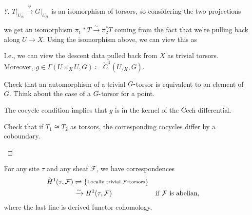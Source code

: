 \begin{proof}[?]

\({ \left.{{T}} \right|_{{U_\text{ét}}} } \xrightarrow{\phi} { \left.{{G}} \right|_{{U_\text{ét}}} }\)
is an isomorphism of torsors, so considering the two projections

we get an isomorphism \(\pi_1*T \xrightarrow{\sim}\pi_2^* T\) coming
from the fact that we're pulling back along \(U\to X\). Using the
isomorphism above, we can view this as

I.e., we can view the descent data pulled back from \(X\) as trivial
torsors. Moreover,
\(g\in \Gamma(U\times_X U, G) \coloneqq{\check{C}}^1(U_{/X}, G)\).

\begin{exercise}[?]

Check that an automorphism of a trivial \(G{\hbox{-}}\)torsor is
equivalent to an element of \(G\). Think about the case of a
\(G{\hbox{-}}\)torsor for a point.

\end{exercise}

\begin{claim}

The cocycle condition implies that \(g\) is in the kernel of the Čech
differential.

\end{claim}

\begin{exercise}[?]

Check that if \(T_1 \cong T_2\) as torsors, the corresponding cocycles
differ by a coboundary.

\end{exercise}

\end{proof}

\begin{proposition}[Identification of $H^1$]

For any site \(\tau\) and any sheaf \(\mathcal{F}\), we have
correspondences
\begin{align*}
{\check{H}}^1(\tau, \mathcal{F})
&\rightleftharpoons
\left\{{\substack{\text{Locally trivial } \mathcal{F}{\hbox{-}}\text{torsors}}}\right\} \\
&\xrightarrow{\sim}H^1(\tau, \mathcal{F}) && \text{if $\mathcal{F}$ is abelian}
,\end{align*}
where the last line is derived functor cohomology.

\end{proposition}

